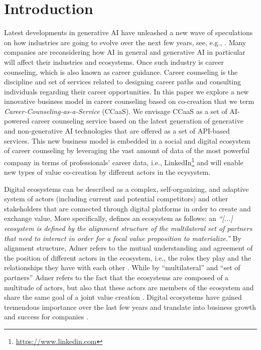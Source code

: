 \section{Introduction}
\label{sec:introduction}

Latest developments in generative AI have unleashed a new wave of speculations on how industries are going to
evolve over the next few years, see, e.g., \cite{chuiHowGenerativeAI2022}. Many companies are reconsidering how
AI in general and generative AI in particular will affect their industries and ecosystems. Once such industry is
career counseling, which is also known as career guidance. Career counseling is the discipline and set of services
related to designing career paths and consulting individuals regarding their career opportunities.
In this paper we explore a new innovative business model in career counseling based on co-creation that we term
\textit{Career-Counseling-as-a-Service} (CCaaS). We envisage CCaaS as a set of AI-powered career counseling service
based on the latest generation of generative and non-generative AI technologies that are offered as a set of API-based
services. This new business model is embedded in a social and digital ecosystem of career counseling by leveraging the
vast amount of data of the most powerful company in terms of professionals' career data, i.e., LinkedIn\footnote[1]{\url{https://www.linkedin.com}}
and will enable new types of value co-creation by different actors in the ecysystem.

Digital ecosystems can be described as a complex, self-organizing, and adaptive system of actors (including current and
potential competitors) and other stakeholders that are connected through digital platforms in order to create and exchange
value. More specifically, \cite{adnerEcosystemStructureActionable2017} defines an ecosystem as follows: an \textit{``[...]
ecosystem is defined by the alignment structure of the multilateral set of partners that need to interact in order for a
focal value proposition to materialize.''} By alignment structure, Adner refers to the mutual understanding and agreement
of the position of different actors in the ecosystem, i.e., the roles they play and the relationships they have with each other
\citep[p. 42]{adnerEcosystemStructureActionable2017}. While by ``multilateral'' and ``set of partners'' Adner refers to
the fact that the ecosystems are composed of a multitude of actors, but also that these actors are members of the ecosystem
and share the same goal of a joint value creation \citep[p. 42-43]{adnerEcosystemStructureActionable2017}. Digital ecosystems
have gained tremendous importance over the last few years and translate into business growth and success for companies
\citep{weillThrivingIncreasinglyDigital2015}.

